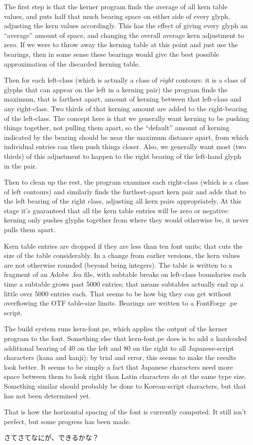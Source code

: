 \documentclass[14pt]{extarticle}
\begin{document}
The first step is that the kerner program finds the average of all kern
table values, and puts half that much bearing space on either side of every
glyph, adjusting the kern values accordingly.  This has the effect of giving
every glyph an ``average'' amount of space, and changing the overall average
kern adjustment to zero.  If we were to throw away the kerning table at this
point and just use the bearings, then in some sense these bearings would
give the best possible approximation of the discarded kerning table.

Then for each left-class (which is actually a class of \emph{right}
contours: it is a class of glyphs that can appear on the left in a kerning
pair) the program finds the maximum, that is farthest apart, amount of
kerning between that left-class and any right-class.  Two thirds of that
kerning amount are added to the right-bearing of the left-class.  The
concept here is that we generally want kerning to be pushing things
together, not pulling them apart, so the ``default'' amount of kerning
indicated by the bearing should be near the maximum distance apart, from
which individual entries can then push things closer.  Also, we generally
want most (two thirds) of this adjustment to happen to the right bearing of
the left-hand glyph in the pair.

Then to clean up the rest, the program examines each right-class (which is a
class of left contours) and similarly finds the furthest-apart kern pair and
adds that to the left bearing of the right class, adjusting all kern pairs
appropriately.  At this stage it's guaranteed that all the kern table
entries will be zero or negative:  kerning only pushes glyphs together from
where they would otherwise be, it never pulls them apart.

Kern table entries are dropped if they are less than ten font units; that
cuts the size of the table considerably.  In a change from earlier versions,
the kern values are not otherwise rounded (beyond being integers).  The
table is written to a fragment of an Adobe .fea file, with subtable breaks
on left-class boundaries each time a subtable grows past 5000 entries;
that means subtables actually end up a little over 5000 entries each.  That
seems to be how big they can get without overflowing the OTF table-size
limits.  Bearings are written to a FontForge .pe script.

The build system runs kern-font.pe, which applies the output of the kerner
program to the font.  Something else that kern-font.pe does is to add a
hardcoded additional bearing of 40 on the left and 80 on the right to all
Japanese-script characters (kana and kanji); by trial and error, this seems
to make the results look better.  It seems to be simply a fact that Japanese
characters need more space between them to look right than Latin characters
do at the same type size.  Something similar should probably be done to
Korean-script characters, but that has not been determined yet.

That is how the horizontal spacing of the font is currently computed.  It
still isn't perfect, but some progress has been made.


\Large さてさてなにが、できるかな？
\end{document}
